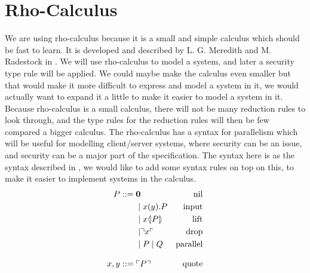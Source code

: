 \section{Rho-Calculus}\label{ch:rho-calculus}
We are using rho-calculus because it is a small and simple calculus which should be fast to learn.
It is developed and described by L. G. Meredith and M. Radestock in \citep{Meredith2005}.
We will use rho-calculus to model a system, and later a security type rule will be applied. We could maybe make the calculus even smaller but that would make it more difficult to express and model a system in it, we would actually want to expand it a little to make it easier to model a system in it.
Because rho-calculus is a small calculus, there will not be many reduction rules to look through, and the type rules for the reduction rules will then be few compared a bigger calculus.
The rho-calculus has a syntax for parallelism which will be useful for modelling client/server systems, where security can be an issue, and security can be a major part of the specification. 
The syntax here is as the syntax described in \citep{Meredith2005}, we would like to add some syntax rules on top on this, to make it easier to implement systems in the calculus.
\begin{align*}
    P  ::= \; &  \mathbf{0} & \text{nil} \\
      & \mid x(y).P & \text{input} \\
      & \mid x \langle \! | P | \! \rangle & \text{lift} \\
      & \mid \urcorner x \ulcorner & \text{drop} \\
      & \mid P \mid Q & \text{parallel} \\[3mm]
    x,y ::= \; & \ulcorner P \urcorner & \text{quote}\\
\end{align*}



